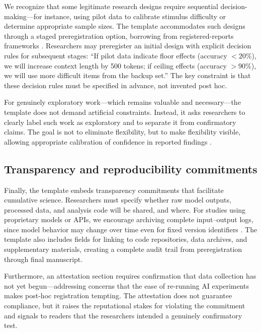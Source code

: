 \documentclass{article}
\theoremstyle{plain}
\theoremstyle{definition}
\theoremstyle{remark}
\begin{document}
We recognize that some legitimate research designs require sequential decision-making---for instance, using pilot data to calibrate stimulus difficulty or determine appropriate sample sizes. The template accommodates such designs through a staged preregistration option, borrowing from registered-reports frameworks \citep{chambers2013registeredreports}. Researchers may preregister an initial design with explicit decision rules for subsequent stages: ``If pilot data indicate floor effects (accuracy $< 20\%$), we will increase context length by 500 tokens; if ceiling effects (accuracy $> 90\%$), we will use more difficult items from the backup set.'' The key constraint is that these decision rules must be specified in advance, not invented post hoc.

For genuinely exploratory work---which remains valuable and necessary---the template does not demand artificial constraints. Instead, it asks researchers to clearly label such work as exploratory and to separate it from confirmatory claims. The goal is not to eliminate flexibility, but to make flexibility visible, allowing appropriate calibration of confidence in reported findings \citep{simmons2011falsepositive,gelman2013forkingpaths}.

\subsection{Transparency and reproducibility commitments}

Finally, the template embeds transparency commitments that facilitate cumulative science. Researchers must specify whether raw model outputs, processed data, and analysis code will be shared, and where. For studies using proprietary models or APIs, we encourage archiving complete input--output logs, since model behavior may change over time even for fixed version identifiers \citep{chen2023chatgptdrift}. The template also includes fields for linking to code repositories, data archives, and supplementary materials, creating a complete audit trail from preregistration through final manuscript.

Furthermore, an attestation section requires confirmation that data collection has not yet begun---addressing concerns that the ease of re-running AI experiments makes post-hoc registration tempting. The attestation does not guarantee compliance, but it raises the reputational stakes for violating the commitment and signals to readers that the researchers intended a genuinely confirmatory test.
\end{document}

